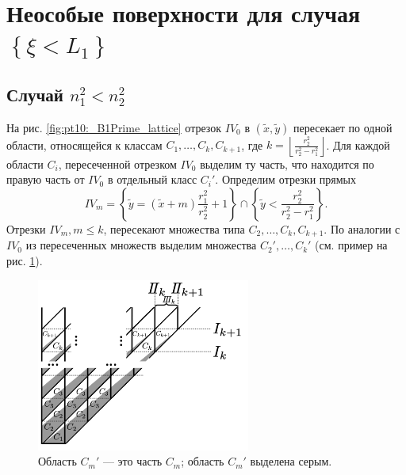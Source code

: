 \section{Неособые поверхности для случая $\left\{\xi < L_1\right\}$}\label{sec:ch5/sec6}
\subsection{Случай $n_1^2<n_2^2$}\label{sec:ch5/sec6/sub1}
На рис. \ref{fig:pt10:_B1Prime_lattice} отрезок $IV_0$ в $(\widetilde{x}, \widetilde{y})$
пересекает по одной области, относящейся к классам $C_1, \ldots, C_k, C_{k+1}$, где $k = \left \lfloor \frac{r_2^2}{r_2^2 - r_1^2} \right \rfloor$. 
Для каждой области  $C_i$, пересеченной отрезком $IV_0$ выделим ту часть, что находится по правую часть от $IV_0$  в отдельный класс $C_i'$.
Определим отрезки прямых 
\begin{equation}
IV_m =  \left\{ \widetilde{y} = (\widetilde{x} + m) \frac{r_1^2}{r_2^2} + 1 \right\} \cap \left\{\widetilde{y}< \frac{r_2^2}{r_2^2-r_1^2}\right\}.
\label{eq:IVdef}
\end{equation} 
Отрезки $IV_m, m \leq k$, пересекают множества типа $C_2, \ldots, C_k, C_{k+1}$. По аналогии с $IV_0$ из пересеченных множеств выделим множества  $C_2', \ldots, C_k'$ (см. пример на рис. \ref{fig:pt10:_C_kPrime_definitions}).

\begin{figure}[!htb]
\centering
\includegraphics[width=7cm]{images/ch4/section3_circular/atoms/branching/C_kPrime_definitions.pdf}
    \caption{Область $C_m'$ --- это часть $C_m$; область $C_m'$ выделена серым.}
    \label{fig:pt10:_C_kPrime_definitions}
\end{figure}

